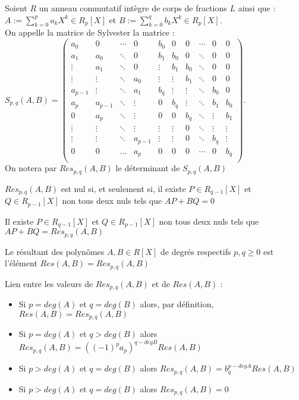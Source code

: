 Soient $R$ un anneau commutatif int\`egre de corps de fractions $L$ ainsi que : \\
$A:=\sum_{k=0}^p a_kX^k \in R_p[X]$ et $B:=\sum_{k=0}^q b_kX^k \in R_p[X]$.\\
On appelle la matrice de Sylvester la matrice : \\
$S_{p,q}(A,B)=\begin{pmatrix}
a_0 & 0 &\cdots & 0 & b_0 & 0 &0 & \cdots & 0 & 0 \\
a_1 & a_0& \ddots & 0 &b_1 & b_0 &0 & \ddots & 0 & 0 \\
\vdots & a_1 &\ddots & 0 &\vdots & b_1 &b_0 & \ddots & 0 & 0 \\
\vdots & \vdots &\ddots & a_0 &\vdots & \vdots & b_1 & \ddots & 0 & 0 \\
a_ {p-1} & \vdots& \ddots & a_1 &b_q & \vdots &\vdots & \ddots & b_0 & 0 \\
a_p & a_{p-1} &\ddots & \vdots &0 & b_q &\vdots & \ddots & b_1 & b_0 \\
0 & a_p &\ddots & \vdots &0 & 0 &b_q & \ddots & \vdots & b_1 \\
\vdots & \vdots &\ddots & \vdots &\vdots & \vdots &0 & \ddots & \vdots & \vdots \\
\vdots & \vdots &\ddots & a_{p-1} &\vdots & \vdots &0 & \ddots & b_q & \vdots \\
0 & 0& \ldots & a_p &0 & 0 &0 & \cdots & 0 & b_q \\
\end{pmatrix}$. \\
On notera par $Res_{p,q}(A,B)$ le d\'eterminant de $S_{p,q}(A,B)$
\begin{prop}
$Res_{p,q}(A,B)$ est nul si, et seulement si, il existe $P \in R_{q-1}[X]$ et $Q \in R_{p-1}[X]$ non tous deux nuls tels que $AP+BQ=0$
\end{prop}
\begin{prop}
Il existe $P \in R_{q-1}[X]$ et $Q \in R_{p-1}[X]$ non tous deux nuls tels que $AP+BQ=Res_{p,q}(A,B)$
\end{prop}
\begin{Def}
Le r\'esultant des polyn\^omes $A,B \in R[X]$ de degr\'es respectifs $p,q \geq 0$ est l'\'el\'ement $Res(A,B)=Res_{p,q}(A,B)$
\end{Def}
\begin{Rq}
Lien entre les valeurs de $Res_{p,q}(A,B)$ et de $Res(A,B)$ : 
\begin{itemize}
    \item Si $p=deg(A)$ et $q=deg(B)$ alors, par d\'efinition, $Res(A,B)=Res_{p,q}(A,B)$
    \item Si $p=deg(A)$ et $q>deg(B)$ alors $Res_{p,q}(A,B)=((-1)^p a_p)^{q-deg B}Res(A,B)$
    \item Si $p>deg(A)$ et $q=deg(B)$ alors $Res_{p,q}(A,B)=b_q^{p-deg A}Res(A,B)$
    \item Si $p>deg(A)$ et $q=deg(B)$ alors $Res_{p,q}(A,B)=0$
\end{itemize}
\end{Rq}
